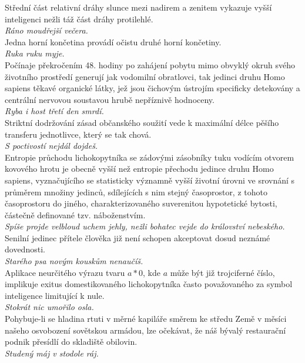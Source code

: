 \begin{multicols}{\value{columnsgames}}
\noindent
Střední část relativní dráhy slunce mezi nadirem a zenitem vykazuje
vyšší inteligenci nežli táž část dráhy protilehlé.\\[1 mm]
{\sl Ráno moudřejší večera.}\\

\noindent
Jedna horní končetina provádí očistu druhé horní končetiny.\\[1 mm]
{\sl Ruka ruku myje.}\\

\noindent
Počínaje překročením 48. hodiny po zahájení pobytu mimo obvyklý
okruh svého životního prostředí generují jak vodomilní obratlovci,
tak jedinci druhu Homo sapiens těkavé organické látky, jež jsou
čichovým ústrojím specificky detekovány a centrální nervovou
soustavou hrubě nepříznivě hodnoceny.\\[1 mm]
{\sl Ryba i host třetí den smrdí.}\\

\noindent
Striktní dodržování zásad občanského soužití vede k maximální
délce pěšího transferu jednotlivce, který se tak chová.\\[1 mm]
{\sl S poctivostí nejdál dojdeš.}\\

\noindent
Entropie průchodu lichokopytníka se zádovými zásobníky tuku
vodícím otvorem kovového hrotu je obecně vyšší než entropie přechodu
jedince druhu Homo sapiens, vyznačujícího se statisticky významně
vyšší životní úrovni ve srovnání s průměrem množiny jedinců,
sdílejících s nim stejný časoprostor, z tohoto časoprostoru do
jiného, charakterizovaného suverenitou hypotetické bytosti, částečně
definované tzv. náboženstvím.\\[1 mm]
{\sl Spíše projde velbloud uchem jehly, nežli bohatec vejde do
království nebeského.}\\

\noindent
Senilní jedinec přítele člověka již není schopen akceptovat
dosud neznámé dovednosti.\\[1 mm]
{\sl Starého psa novým kouskům nenaučíš.}\\

\noindent
Aplikace neurčitého výrazu tvaru $a*0$, kde $a$ může být již
trojciferné číslo, implikuje exitus domestikovaného lichokopytníka
často považovaného za symbol inteligence limitující k nule.\\[1 mm]
{\sl Stokrát nic umořilo osla.}\\

\noindent
Pohybuje-li se hladina rtuti v měrné kapiláře směrem ke středu
Země v měsíci našeho osvobození sovětskou armádou, lze očekávat,
že náš bývalý restaurační podnik přesídlí do skladiště obilovin.\\[1 mm]
{\sl Studený máj v stodole ráj.}\\


\end{multicols}
